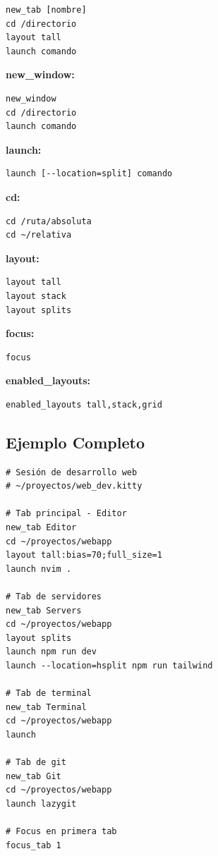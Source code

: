 \documentclass[
  doc,
  floatsintext,
  longtable,
  a4paper,
  nolmodern,
  notxfonts,
  notimes,
  12pt,
  colorlinks=true,linkcolor=blue,citecolor=blue,urlcolor=blue]{apa7}
\begin{document}
\begin{verbatim}
new_tab [nombre]
cd /directorio
layout tall
launch comando
\end{verbatim}

\textbf{new\_window:}

\begin{verbatim}
new_window
cd /directorio
launch comando
\end{verbatim}

\textbf{launch:}

\begin{verbatim}
launch [--location=split] comando
\end{verbatim}

\textbf{cd:}

\begin{verbatim}
cd /ruta/absoluta
cd ~/relativa
\end{verbatim}

\textbf{layout:}

\begin{verbatim}
layout tall
layout stack
layout splits
\end{verbatim}

\textbf{focus:}

\begin{verbatim}
focus
\end{verbatim}

\textbf{enabled\_layouts:}

\begin{verbatim}
enabled_layouts tall,stack,grid
\end{verbatim}

\subsection{Ejemplo Completo}\label{ejemplo-completo}

\begin{verbatim}
# Sesión de desarrollo web
# ~/proyectos/web_dev.kitty

# Tab principal - Editor
new_tab Editor
cd ~/proyectos/webapp
layout tall:bias=70;full_size=1
launch nvim .

# Tab de servidores
new_tab Servers
cd ~/proyectos/webapp
layout splits
launch npm run dev
launch --location=hsplit npm run tailwind

# Tab de terminal
new_tab Terminal
cd ~/proyectos/webapp
launch

# Tab de git
new_tab Git
cd ~/proyectos/webapp
launch lazygit

# Focus en primera tab
focus_tab 1
\end{verbatim}
\end{document}
